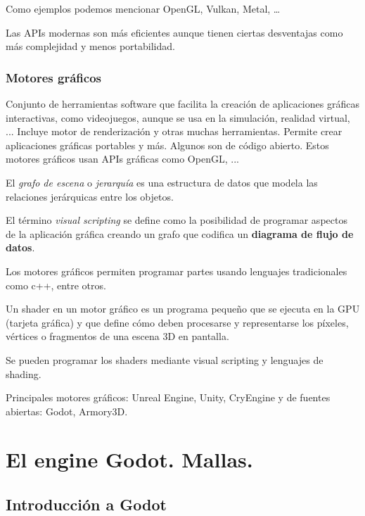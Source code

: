 \documentclass[12pt]{book} %
\begin{document}
Como ejemplos podemos mencionar OpenGL, Vulkan, Metal, \ldots{}

Las APIs modernas son más eficientes aunque tienen ciertas desventajas
como más complejidad y menos portabilidad.

\hypertarget{motores-gruxe1ficos}{%
\subsection{Motores gráficos}\label{motores-gruxe1ficos}}

\begin{definicion}
Conjunto de herramientas software que facilita la creación de aplicaciones gráficas interactivas, como videojuegos, aunque se usa en la simulación, realidad virtual, ... Incluye motor de renderización y otras muchas herramientas. Permite crear aplicaciones gráficas portables y más. Algunos son de código abierto. Estos motores gráficos usan APIs gráficas como OpenGL, ...
\end{definicion}

El \emph{grafo de escena} o \emph{jerarquía} es una estructura de datos
que modela las relaciones jerárquicas entre los objetos.

El término \emph{visual scripting} se define como la posibilidad de
programar aspectos de la aplicación gráfica creando un grafo que
codifica un \textbf{diagrama de flujo de datos}.

Los motores gráficos permiten programar partes usando lenguajes
tradicionales como c++, entre otros.

\begin{definicion}
Un shader en un motor gráfico es un programa pequeño que se ejecuta en la GPU (tarjeta gráfica) y que define cómo deben procesarse y representarse los píxeles, vértices o fragmentos de una escena 3D en pantalla.
\end{definicion}

Se pueden programar los shaders mediante visual scripting y lenguajes de
shading.

Principales motores gráficos: Unreal Engine, Unity, CryEngine y de
fuentes abiertas: Godot, Armory3D.

\hypertarget{el-engine-godot.-mallas.}{%
\chapter{El engine Godot. Mallas.}\label{el-engine-godot.-mallas.}}

\hypertarget{introducciuxf3n-a-godot}{%
\section{Introducción a Godot}\label{introducciuxf3n-a-godot}}
\end{document}
